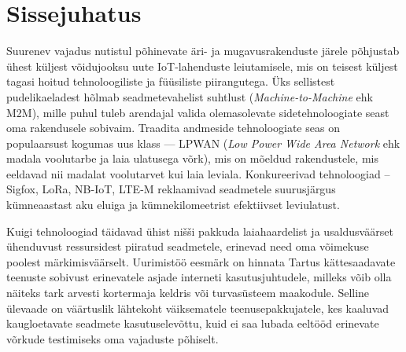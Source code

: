 \documentclass[12pt]{article}
\newcommand{\TODO}{\todo[inline]}
\begin{document}
    {\EngInfo}{\EstInfo}


    \newpage
    \setlength{\parskip}{0em}
    \tableofcontents
    \setlength{\parskip}{1em}



    \newpage


    \section{Sissejuhatus}


    Suurenev vajadus nutistul põhinevate äri- ja mugavusrakenduste järele põhjustab ühest küljest võidujooksu uute IoT-lahenduste leiutamisele, mis on teisest küljest tagasi hoitud tehnoloogiliste ja füüsiliste piirangutega.
    Üks sellistest pudelikaeladest hõlmab seadmetevahelist suhtlust (\textit{Machine-to-Machine} ehk M2M), mille puhul tuleb arendajal valida olemasolevate sidetehnoloogiate seast oma rakendusele sobivaim.
    Traadita andmeside tehnoloogiate seas on populaarsust kogumas uus klass — LPWAN (\textit{Low Power Wide Area Network} ehk madala voolutarbe ja laia ulatusega võrk), mis on mõeldud rakendustele, mis eeldavad nii madalat voolutarvet kui laia leviala.
    Konkureerivad tehnoloogiad -- Sigfox, LoRa, NB-IoT, LTE-M reklaamivad seadmetele suurusjärgus kümneaastast aku eluiga ja kümnekilomeetrist efektiivset leviulatust.

    Kuigi tehnoloogiad täidavad ühist nišši pakkuda laiahaardelist ja usaldusväärset ühenduvust ressursidest piiratud seadmetele, erinevad need oma võimekuse poolest märkimisväärselt.
    Uurimistöö eesmärk on hinnata Tartus kättesaadavate teenuste sobivust erinevatele asjade interneti kasutusjuhtudele, milleks võib olla näiteks tark arvesti kortermaja keldris või turvasüsteem maakodule.
    Selline ülevaade on väärtuslik lähtekoht väiksematele teenusepakkujatele, kes kaaluvad kaugloetavate seadmete kasutuselevõttu, kuid ei saa lubada eeltööd erinevate võrkude testimiseks oma vajaduste põhiselt.
\end{document}
